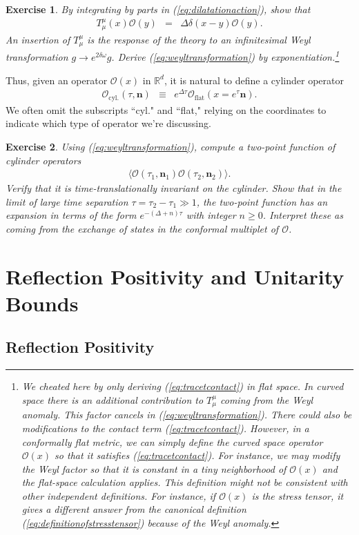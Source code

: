 \documentclass{ws-rv9x6}
\newcommand\be{\begin{eqnarray}}
\newcommand\ee{\end{eqnarray}}
\newcommand\cO{\mathcal{O}}
\newcommand\<\langle
\renewcommand\>\rangle
\newcommand\de\delta
\newcommand\R{\mathbb{R}}
\renewcommand\.{\cdot}
\newcommand\De{\Delta}
\newcommand\bn{\mathbf{n}}
\newtheorem{exercise}{Exercise}[section]
\begin{document}
\begin{exercise}
By integrating by parts in (\ref{eq:dilatationaction}), show that 
\be
\label{eq:tracetcontact}
T_\mu^\mu(x) \cO(y) &=& \De \de(x-y)\cO(y).
\ee
An insertion of $T_\mu^\mu$ is the response of the theory to an infinitesimal Weyl transformation $g\to e^{2\de\omega} g$. Derive (\ref{eq:weyltransformation}) by exponentiation.\footnote{We cheated here by only deriving (\ref{eq:tracetcontact}) in flat space.  In curved space there is an additional contribution to $T_\mu^\mu$ coming from the Weyl anomaly.  This factor cancels in (\ref{eq:weyltransformation}). There could also be modifications to the contact term (\ref{eq:tracetcontact}). However, in a conformally flat metric, we can simply define the curved space operator $\cO(x)$ so that it satisfies (\ref{eq:tracetcontact}). For instance, we may modify the Weyl factor so that it is constant in a tiny neighborhood of $\cO(x)$ and the flat-space calculation applies. This definition might not be consistent with other independent definitions. For instance, if $\cO(x)$ is the stress tensor, it gives a different answer from the canonical definition (\ref{eq:definitionofstresstensor}) because of the Weyl anomaly.}
\end{exercise}

Thus, given an operator $\cO(x)$ in $\R^d$, it is natural to define a cylinder operator
\be
\label{eq:definitionofcylinderop}
\cO_\mathrm{cyl.}(\tau,\bn) &\equiv& e^{\De \tau} \cO_\mathrm{flat}(x=e^\tau \bn).
\ee
We often omit the subscripts ``cyl." and ``flat," relying on the coordinates to indicate which type of operator we're discussing.
\begin{exercise}
Using (\ref{eq:weyltransformation}), compute a two-point function of cylinder operators
\be
\<\cO(\tau_1,\bn_1)\cO(\tau_2,\bn_2)\>.
\ee
Verify that it is time-translationally invariant on the cylinder. Show that in the limit of large time separation $\tau=\tau_2-\tau_1 \gg 1$, the two-point function has an expansion in terms of the form $e^{-(\De+n)\tau}$ with integer $n\geq 0$.  Interpret these as coming from the exchange of states in the conformal multiplet of $\cO$.
\end{exercise}

\section{Reflection Positivity and Unitarity Bounds}

\subsection{Reflection Positivity}
\label{sec:reflectionpositivity}
\end{document}
